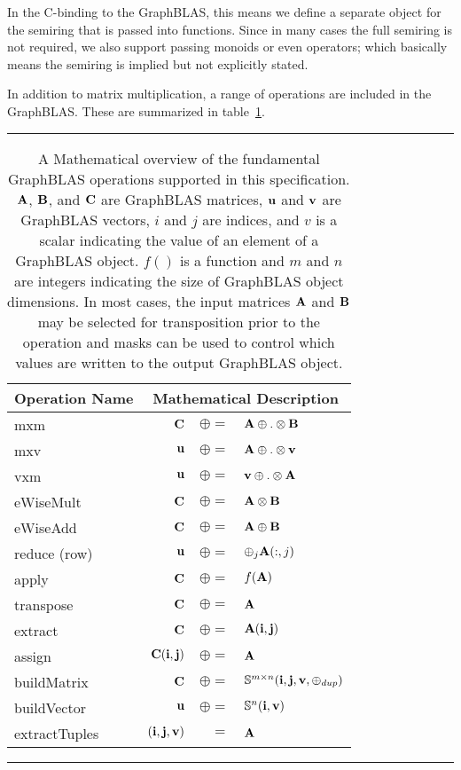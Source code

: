 In the C-binding to the GraphBLAS, this means we define a separate object for the semiring 
that is passed into functions.  Since in many cases the full
semiring is not required, we also support passing monoids or
even operators; which basically means the semiring is implied but not 
explicitly stated.

In addition to matrix multiplication, a range of operations are included
in the GraphBLAS.  These are summarized in table~\ref{Tab:GraphBLASOps}.

\begin{table}[h]
\hrule
\begin{center}
\caption{A Mathematical overview of the fundamental GraphBLAS operations supported
in this specification. ${\bf A}$, ${\bf B}$, and ${\bf C}$ are GraphBLAS matrices, 
${\bf u}$ and ${\bf v}$ are GraphBLAS vectors, $i$ and $j$ are indices, and $v$ is a scalar 
indicating the value of an element of a GraphBLAS object.  $f()$ is a function and $m$ and $n$ are 
integers indicating the size of GraphBLAS object dimensions.  In most cases, the input matrices ${\bf A}$ and ${\bf B}$ may be selected for transposition prior to the operation and masks can be used to control
which values are written to the output GraphBLAS object.}
\label{Tab:GraphBLASOps}
\begin{tabular}{l|rrl}
{\sf Operation Name} & \multicolumn{3}{c}{Mathematical Description}  \\
\hline
{\sf mxm}          & ${\bf C}$ & $\oplus=$ & ${\bf A} \oplus.\otimes {\bf B}$  \\
{\sf mxv}          & ${\bf u}$ & $\oplus=$ & ${\bf A} \oplus.\otimes {\bf v}$  \\
{\sf vxm}          & ${\bf u}$ & $\oplus=$ & ${\bf v} \oplus.\otimes {\bf A}$  \\
{\sf eWiseMult}    & ${\bf C}$ & $\oplus=$ & ${\bf A} \otimes {\bf B}$  \\
{\sf eWiseAdd}     & ${\bf C}$ & $\oplus=$ & ${\bf A} \oplus  {\bf B}$  \\
{\sf reduce} (row) & ${\bf u}$ & $\oplus=$ & $\oplus_j{\bf A}(:,j)$  \\
{\sf apply}        & ${\bf C}$ & $\oplus=$ & $f({\bf A})$ \\
{\sf transpose}    & ${\bf C}$ & $\oplus=$ & ${\bf A}$ \\
{\sf extract}      & ${\bf C}$ & $\oplus=$ & ${\bf A}({\bf i},{\bf j})$ \\
{\sf assign}       & ${\bf C}({\bf i},{\bf j})$ & $\oplus=$ & ${\bf A}$ \\
{\sf buildMatrix}  & ${\bf C}$ & $\oplus=$ & $\mathbb{S}^{m\times n}({\bf i},{\bf j},{\bf v},\oplus_{dup})$ \\
{\sf buildVector}  & ${\bf u}$ & $\oplus=$ & $\mathbb{S}^{n}({\bf i},{\bf v})$ \\
{\sf extractTuples}& $({\bf i},{\bf j},{\bf v})$ & $=$ & ${\bf A}$ \\
\end{tabular}
\end{center}
\hrule
\end{table}

